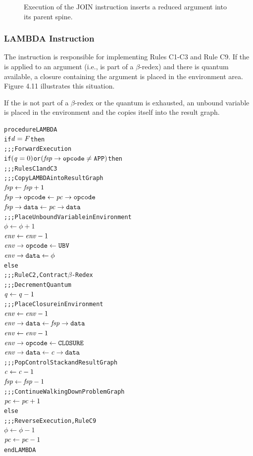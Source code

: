 \begin{figure}[hp]
\centering

\caption[Execution of JOIN instruction]{Execution of the JOIN instruction inserts a reduced argument into its parent spine.}
\end{figure}

\subsubsection*{LAMBDA Instruction}

The  instruction is responsible for implementing Rules C1-C3 and Rule C9. If the  is applied to an argument (i.e., is part of a \(\beta\)-redex) and there is quantum available, a closure containing the argument is placed in the environment area. Figure 4.11 illustrates this situation.

If the  is not part of a \(\beta\)-redex or the quantum is exhausted, an unbound variable is placed in the environment and the  copies itself into the result graph.

\par\smallskip\noindent\begin{minipage}{\linewidth}
\begin{alltt}
procedure LAMBDA
  if \(\rt{d} = F\) then
    \textrm{;;; Forward Execution}
    if \((\rt{q} = 0)\) or \((\rtfield{fsp}{opcode} \neq \mathtt{APP})\) then
      \textrm{;;; Rules C1 and C3}
      \textrm{;;; Copy LAMBDA into Result Graph}
      \(\rt{fsp} \leftarrow \rt{fsp}+1\)
      \(\rtfield{fsp}{opcode} \leftarrow \rtfield{pc}{opcode}\)
      \(\rtfield{fsp}{data} \leftarrow \rtfield{pc}{data}\)
      \textrm{;;; Place Unbound Variable in Environment}
      \(\phi \leftarrow \phi+1\)
      \(\rt{env} \leftarrow \rt{env}-1\)
      \(\rtfield{env}{opcode} \leftarrow \mathtt{UBV}\)
      \(\rtfield{env}{data} \leftarrow \phi\)
    else
      \textrm{;;; Rule C2, Contract \(\beta\)-Redex}
      \textrm{;;; Decrement Quantum}
      \(\rt{q} \leftarrow \rt{q}-1\)
      \textrm{;;; Place Closure in Environment}
      \(\rt{env} \leftarrow \rt{env}-1\)
      \(\rtfield{env}{data} \leftarrow \rtfield{fsp}{data}\)
      \(\rt{env} \leftarrow \rt{env}-1\)
      \(\rtfield{env}{opcode} \leftarrow \mathtt{CLOSURE}\)
      \(\rtfield{env}{data} \leftarrow \rtfield{c}{data}\)
      \textrm{;;; Pop Control Stack and Result Graph}
      \(\rt{c} \leftarrow \rt{c}-1\)
      \(\rt{fsp} \leftarrow \rt{fsp}-1\)
    \textrm{;;; Continue Walking Down Problem Graph}
    \(\rt{pc} \leftarrow \rt{pc}+1\)
  else
    \textrm{;;; Reverse Execution, Rule C9}
    \(\phi \leftarrow \phi-1\)
    \(\rt{pc} \leftarrow \rt{pc}-1\)
end LAMBDA
\end{alltt}
\end{minipage}\par\smallskip


